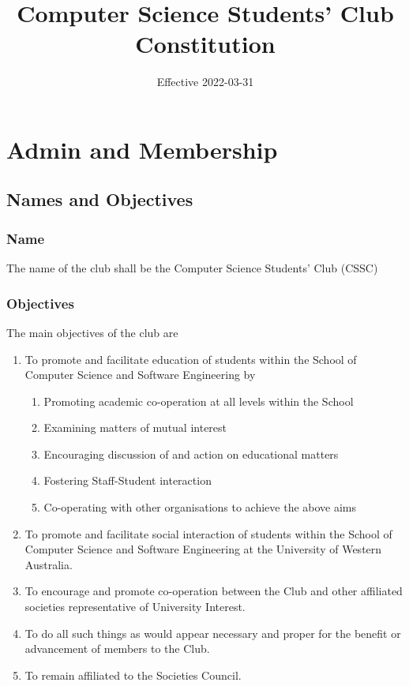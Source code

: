 \documentclass[10pt,a4paper]{report}
\date{Effective 2022-03-31}
\title{Computer Science Students' Club Constitution}
\begin{document}
	\maketitle
	\newpage
	\begin{small}
		\tableofcontents
	\end{small}
	\newpage

	\chapter{Admin and Membership}

	\section{Names and Objectives}
		\subsection{Name}
			The name of the club shall be the Computer Science Students' Club (CSSC)

		\subsection{Objectives}
		The main objectives of the club are
			\begin{enumerate}[label=\alph*]
				\item To promote and facilitate education of students within the School of Computer Science and Software Engineering by
				\begin{enumerate}[label=\roman*]
					\item Promoting academic co-operation at all levels within the School
					\item Examining matters of mutual interest
					\item Encouraging discussion of and action on educational matters
					\item Fostering Staff-Student interaction
					\item Co-operating with other organisations to achieve the above aims
				\end{enumerate}
				\item To promote and facilitate social interaction of students within the School of Computer Science and Software Engineering at the University of Western Australia.
				\item To encourage and promote co-operation between the Club and other affiliated societies representative of University Interest.
				\item To do all such things as would appear necessary and proper for the benefit or advancement of members to the Club.
				\item To remain affiliated to the Societies Council.
			\end{enumerate}
\end{document}
